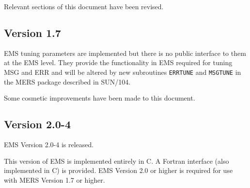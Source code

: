 \documentclass[twoside,11pt]{article}
\newcommand{\latex}[1]{#1}
\newcommand{\xref}[3]{#1}
\newcommand{\xlabel}[1]{}
\renewcommand{\_}{\texttt{\symbol{95}}}
\begin{document}
Relevant sections of this document have been revised.

\subsection{\xlabel{version_1_7}Version 1.7}
\label{version_1_7}

EMS tuning parameters are implemented but there is no public interface to
them at the EMS level.  They provide the functionality in EMS required for
tuning MSG and ERR and will be altered by new subroutines 
\xref{\texttt{ERR\_TUNE}}{sun104}{ERR_TUNE}
and
\xref{\texttt{MSG\_TUNE}}{sun104}{MSG_TUNE}
in the 
\xref{MERS}{sun104}{} package\latex{ described in SUN/104}.

Some cosmetic improvements have been made to this document.

\subsection{\xlabel{version_2_0_4}Version 2.0-4}
\label{version_2_0_4}
EMS Version 2.0-4 is released.

This version of EMS is implemented entirely in C.  A Fortran interface
(also implemented in C) is provided. EMS Version 2.0 or higher is required
for use with MERS Version 1.7 or higher.
\end{document}

